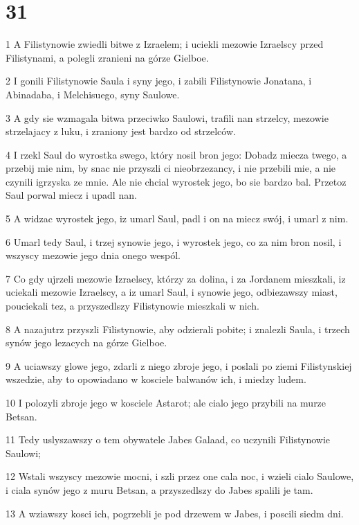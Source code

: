 \chapter{31}

\par 1 A Filistynowie zwiedli bitwe z Izraelem; i uciekli mezowie Izraelscy przed Filistynami, a polegli zranieni na górze Gielboe.
\par 2 I gonili Filistynowie Saula i syny jego, i zabili Filistynowie Jonatana, i Abinadaba, i Melchisuego, syny Saulowe.
\par 3 A gdy sie wzmagala bitwa przeciwko Saulowi, trafili nan strzelcy, mezowie strzelajacy z luku, i zraniony jest bardzo od strzelców.
\par 4 I rzekl Saul do wyrostka swego, który nosil bron jego: Dobadz miecza twego, a przebij mie nim, by snac nie przyszli ci nieobrzezancy, i nie przebili mie, a nie czynili igrzyska ze mnie. Ale nie chcial wyrostek jego, bo sie bardzo bal. Przetoz Saul porwal miecz i upadl nan.
\par 5 A widzac wyrostek jego, iz umarl Saul, padl i on na miecz swój, i umarl z nim.
\par 6 Umarl tedy Saul, i trzej synowie jego, i wyrostek jego, co za nim bron nosil, i wszyscy mezowie jego dnia onego wespól.
\par 7 Co gdy ujrzeli mezowie Izraelscy, którzy za dolina, i za Jordanem mieszkali, iz uciekali mezowie Izraelscy, a iz umarl Saul, i synowie jego, odbiezawszy miast, pouciekali tez, a przyszedlszy Filistynowie mieszkali w nich.
\par 8 A nazajutrz przyszli Filistynowie, aby odzierali pobite; i znalezli Saula, i trzech synów jego lezacych na górze Gielboe.
\par 9 A uciawszy glowe jego, zdarli z niego zbroje jego, i poslali po ziemi Filistynskiej wszedzie, aby to opowiadano w kosciele balwanów ich, i miedzy ludem.
\par 10 I polozyli zbroje jego w kosciele Astarot; ale cialo jego przybili na murze Betsan.
\par 11 Tedy uslyszawszy o tem obywatele Jabes Galaad, co uczynili Filistynowie Saulowi;
\par 12 Wstali wszyscy mezowie mocni, i szli przez one cala noc, i wzieli cialo Saulowe, i ciala synów jego z muru Betsan, a przyszedlszy do Jabes spalili je tam.
\par 13 A wziawszy kosci ich, pogrzebli je pod drzewem w Jabes, i poscili siedm dni.


